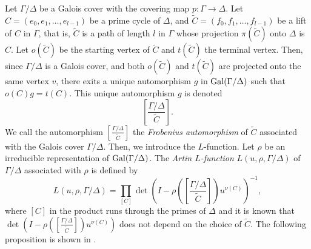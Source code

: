 \documentclass[lualatex,12pt]{article}
\begin{document}
Let $\Gamma/\Delta$ be a Galois cover with the covering map $p: \Gamma\to \Delta$.
Let $C=(e_0, e_1, \ldots, e_{l-1})$ be a prime cycle of $\Delta$,
and $\widetilde{C}=(f_0,f_1,\ldots, f_{l-1})$ be a lift 
of $C$ in $\Gamma$, that is, $\widetilde{C}$ is a path of length $l$
in $\Gamma$ whose projection $\pi(\widetilde{C})$ onto $\Delta$ is $C$.
Let $o(\widetilde{C})$ be the starting vertex of $\widetilde{C}$ and
$t(\widetilde{C})$ the terminal vertex.
Then, since $\Gamma/\Delta$ is a Galois cover, and
both $o(\widetilde{C})$ and $t(\widetilde{C})$ are projected onto the same vertex $v$, 
there exits a unique automorphism $g$ in ${\rm Gal}(\Gamma/\Delta)$ such
that $o(C)g = t(C)$. This unique automorphism $g$ is denoted
\[
\left[\frac{\Gamma/\Delta}{\widetilde{C}}\right]. 
\]
We call the automorphism $\left[\frac{\Gamma/\Delta}{\widetilde{C}}\right]$
the {\em Frobenius automorphism} of $\widetilde{C}$
associated with the Galois cover $\Gamma/\Delta$.
Then, we introduce the $L$-function.
Let $\rho$ be an irreducible representation of ${\rm Gal}(\Gamma/\Delta)$.
The {\em Artin $L$-function} $L(u, \rho, \Gamma/\Delta)$ 
of $\Gamma/\Delta$ associated
with $\rho$ is defined by
\begin{equation}
 \label{eq:Lfundef}
 L(u, \rho, \Gamma/\Delta) = 
 \prod_{[C]}\det\left(I-\rho\left(\left[\frac{\Gamma/\Delta}{\widetilde{C}}\right]\right)u^{\nu(C)}\right)^{-1},
\end{equation}
where $[C]$ in the product runs through the primes of $\Delta$
and it is known that 
$\det\left(I-\rho\left(\left[\frac{\Gamma/\Delta}{\widetilde{C}}\right]\right)u^{\nu(C)}\right)$ 
does not depend on the choice of $\widetilde{C}$.
The following proposition is shown in
\cite[p.154--155]{terras2010zeta}.
\end{document}
